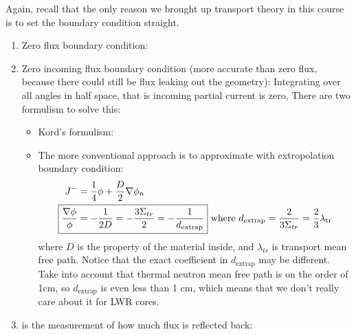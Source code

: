 \documentclass{school-22.211-notes}
\begin{document}
\clearpage
{}
Again, recall that the only reason we brought up transport theory in this course is to set the boundary condition straight. 
\begin{enumerate}
\item Zero flux boundary condition:

\item Zero incoming flux boundary condition (more accurate than zero flux, because there could still be flux leaking out the geometry):
Integrating over all angles in half space, that is incoming partial current is zero, 
There are two formulism to solve this:
  \begin{itemize}
  \item Kord's formulism: 
  \item The more conventional approach is to approximate with extropolation boundary condition: 
    \begin{align}
      J^- &= \frac{1}{4} \phi + \frac{D}{2} \gradient \phi_n \\
      \Aboxed{ \frac{\gradient \phi}{\phi} &= - \frac{1}{2D} = - \frac{3\Sigma_{tr}}{2} = - \frac{1}{d_{\mathrm{extrap}}}} 
\mbox{   where } d_{\mathrm{extrap}} = \frac{2}{3 \Sigma_{tr}}  = \frac{2}{3} \lambda_{\mathrm{tr}}
    \end{align}
    where $D$ is the property of the material inside, and $\lambda_{tr}$ is transport mean free path. Notice that the exact coefficient in $d_{\mathrm{extrap}}$ may be different. Take into account that thermal neutron mean free path is on the order of 1cm, so $d_{\mathrm{extrap}}$ is even less than 1 cm, which means that we don't really care about it for LWR cores. 
  \end{itemize}

\item {} is the measurement of how much flux is reflected back: 

\end{enumerate}
\end{document}
